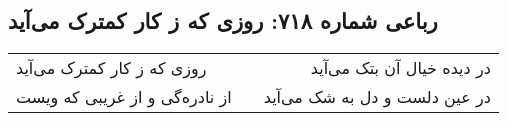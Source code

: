\begin{center}
\section*{رباعی شماره ۷۱۸: روزی که ز کار کمترک می‌آید}
\label{sec:0718}
\begin{longtable}{l p{0.5cm} r}
روزی که ز کار کمترک می‌آید
&&
در دیده خیال آن بتک می‌آید
\\
از نادره‌گی و از غریبی که ویست
&&
در عین دلست و دل به شک می‌آید
\\
\end{longtable}
\end{center}
